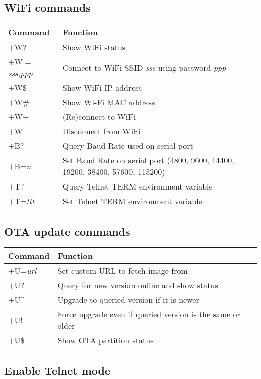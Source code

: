 \subsection{WiFi commands}

\begin{tabular}{p{6em} | p{}}
\hline
\textbf{Command} & \textbf{Function} \\
\hline
$+$W?		& Show WiFi status \\
$+$W$=$\textit{sss},\textit{ppp}	& Connect to WiFi SSID \textit{sss} using password \textit{ppp} \\
$+$W\$		& Show WiFi IP address \\
$+$W\#		& Show Wi-Fi MAC address \\
$+$W$+$		& (Re)connect to WiFi \\
$+$W$-$		& Disconnect from WiFi \\
$+$B?		& Query Baud Rate used on serial port \\
$+$B=\textit{n}	& Set Baud Rate on serial port \newline
			(4800, 9600, 14400, 19200, 38400, 57600, 115200) \\
$+$T?		& Query Telnet TERM environment variable \\
$+$T=\textit{ttt}	& Set Telnet TERM environment variable \\
\hline
\end{tabular}

\subsection{OTA update commands}
\label{modemota}

\begin{tabular}{p{6em} | p{}}
\hline
\textbf{Command} 		& \textbf{Function} \\
\hline
$+$U=\textit{url}		& Set custom URL to fetch image from \\
$+$U?					& Query for new version online and show status \\
$+$U\textasciicircum 	& Upgrade to queried version if it is newer \\
$+$U!					& Force upgrade even if queried version is the same or older \\
$+$U\$					& Show OTA partition status \\
\hline
\end{tabular}

\subsection{Enable Telnet mode}

